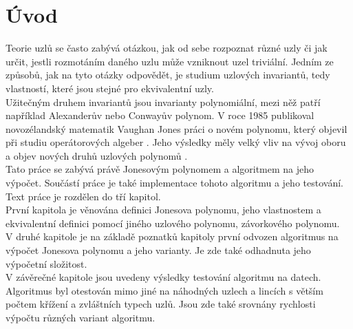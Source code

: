 \chapter*{Úvod}

Teorie uzlů se často zabývá otázkou, jak od sebe rozpoznat různé uzly či jak určit, jestli rozmotáním daného uzlu může vzniknout uzel triviální. Jedním ze způsobů, jak na tyto otázky odpovědět, je studium uzlových invariantů, tedy vlastností, které jsou stejné pro ekvivalentní uzly.
\\
Užitečným druhem invariantů jsou invarianty polynomiální, mezi něž patří například Alexanderův nebo	 Conwayův polynom. 
V roce 1985 publikoval novozélandský matematik Vaughan Jones práci o novém polynomu, který objevil při studiu operátorových algeber  \cite{jones1985}. 
Jeho výsledky měly velký vliv na vývoj oboru a objev nových druhů uzlových polynomů \cite{cromwell2004knots}.
\\
Tato práce se zabývá právě Jonesovým polynomem a algoritmem na jeho výpočet. Součástí práce je také implementace tohoto algoritmu a jeho testování.
\\
Text práce je rozdělen do tří kapitol. 
\\
První kapitola je věnována definici Jonesova polynomu, jeho vlastnostem a ekvivalentní definici pomocí jiného uzlového polynomu, závorkového polynomu.
\\
V druhé kapitole je na základě poznatků kapitoly první odvozen algoritmus na výpočet Jonesova polynomu a jeho varianty. Je zde také odhadnuta jeho výpočetní složitost.
\\
V závěrečné kapitole jsou uvedeny výsledky testování algoritmu na datech. Algoritmus byl otestován mimo jiné na náhodných uzlech a lincích s větším počtem křížení a zvláštních typech uzlů. Jsou zde také srovnány rychlosti výpočtu různých variant algoritmu.

